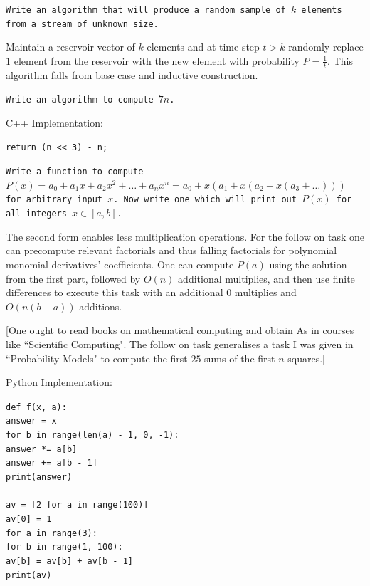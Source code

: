 \texttt{Write an algorithm that will produce a random sample of $k$ elements from a stream of unknown size.}

Maintain a reservoir vector of $k$ elements and at time step $t>k$ randomly replace $1$ element from the reservoir with the new element with probability $P=\frac{1}{t}$. This algorithm falls from base case and inductive construction.

\texttt{Write an algorithm to compute $7n$.}

C++ Implementation:

\begin{verbatim}
return (n << 3) - n;
\end{verbatim}

\texttt{Write a function to compute $P(x)=a_0+a_1 x+a_2 x^2 + \dots + a_n x^n=a_0+x(a_1+x(a_2+x(a_3+\dots)))$ for arbitrary input $x$. Now write one which will print out $P(x)$ for all integers $x \in [a,b]$.}

The second form enables less multiplication operations. For the follow on task one can precompute relevant factorials and thus falling factorials for polynomial monomial derivatives' coefficients. One can compute $P(a)$ using the solution from the first part, followed by $O(n)$ additional multiplies, and then use finite differences to execute this task with an additional $0$ multiplies and $O(n(b-a))$ additions.

[One ought to read books on mathematical computing and obtain As in courses like ``Scientific Computing". The follow on task generalises a task I was given in ``Probability Models" to compute the first $25$ sums of the first $n$ squares.]

Python Implementation:

\texttt{def f(x, a):} \\
\phantom{xxxx}\texttt{answer = x} \\
\phantom{xxxx}\texttt{for b in range(len(a) - 1, 0, -1):} \\
\phantom{xxxxxxxx}\texttt{answer *= a[b]} \\
\phantom{xxxxxxxx}\texttt{answer += a[b - 1]} \\
\phantom{xxxx}\texttt{print(answer)} \\
~\\
\texttt{av = [2 for a in range(100)]} \\
\texttt{av[0] = 1} \\
\texttt{for a in range(3):} \\
\phantom{xxxx}\texttt{for b in range(1, 100):} \\
\phantom{xxxxxxxx}\texttt{av[b] = av[b] + av[b - 1]} \\
\texttt{print(av)}

